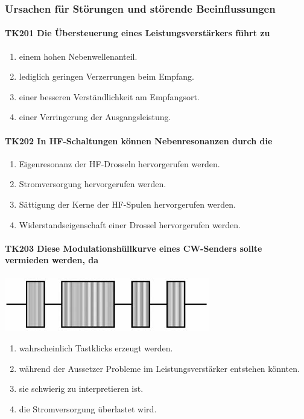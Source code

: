 \documentclass[8pt]{article}
\begin{document}
\pagebreak
\subsubsection{Ursachen für Störungen und störende Beeinflussungen}
\paragraph*{TK201 Die Übersteuerung eines Leistungsverstärkers führt zu}
\begin{enumerate}[nolistsep,label=\Alph*]
\item einem hohen Nebenwellenanteil.
\item lediglich geringen Verzerrungen beim Empfang.
\item einer besseren Verständlichkeit am Empfangsort.
\item einer Verringerung der Ausgangsleistung.
\end{enumerate}

\paragraph*{TK202 In HF-Schaltungen können Nebenresonanzen durch die}
\begin{enumerate}[nolistsep,label=\Alph*]
\item Eigenresonanz der HF-Drosseln hervorgerufen werden.
\item Stromversorgung hervorgerufen werden.
\item Sättigung der Kerne der HF-Spulen hervorgerufen werden.
\item Widerstandseigenschaft einer Drossel hervorgerufen werden.
\end{enumerate}

\paragraph*{TK203 Diese Modulationshüllkurve eines CW-Senders sollte vermieden werden, da}
\begin{center}
	\begin{minipage}{\linewidth}
		\centering
		\includegraphics[scale=1.0]{pics/tk203_a.jpg}
	\end{minipage}
\end{center}
\begin{enumerate}[nolistsep,label=\Alph*]
\item wahrscheinlich Tastklicks erzeugt werden.
\item während der Aussetzer Probleme im Leistungsverstärker entstehen könnten.
\item sie schwierig zu interpretieren ist.
\item die Stromversorgung überlastet wird.
\end{enumerate}
\end{document}
